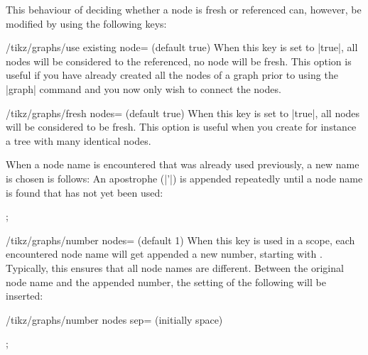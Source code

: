 This behaviour of deciding whether a node is fresh or referenced can,
however, be modified by using the following keys:
\begin{key}{/tikz/graphs/use existing node= (default true)}
  When this key is set to |true|, all nodes will be considered to the
  referenced, no node will be fresh. This option is useful if you have
  already created all the nodes of a graph prior to using the |graph|
  command and you now only wish to connect the nodes.
\end{key}
\begin{key}{/tikz/graphs/fresh nodes= (default true)}
  When this key is set to |true|, all nodes will be considered to be
  fresh. This option is useful when you create for instance a tree
  with many identical nodes.

  When a node name is encountered that was already used previously,
  a new name is chosen is follows: An apostrophe (|'|) is appended
  repeatedly until a node name is found that has not yet been
  used:
\begin{codeexample}[]
\tikz {};
\end{codeexample}
\end{key}

\begin{key}{/tikz/graphs/number nodes= (default 1)}
  When this key is used in a scope, each encountered node name will
  get appended a new number, starting with . Typically,
  this ensures that all node names are different. Between the original
  node name and the appended number, the setting of the following will
  be inserted:
  \begin{key}{/tikz/graphs/number nodes sep= (initially \normalfont space)}
  \end{key}
\begin{codeexample}[]
\tikz {};
\end{codeexample}
\end{key}

